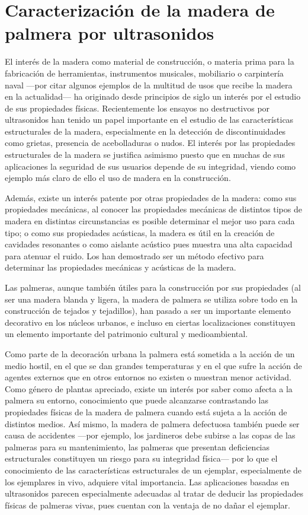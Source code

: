 \chapter{Caracterización de la madera de palmera por ultrasonidos}

El interés de la madera como material de construcción, o materia prima para
la fabricación de herramientas, instrumentos musicales, mobiliario o
carpintería naval ---por citar algunos ejemplos de la multitud de usos que
recibe la madera en la actualidad--- ha originado desde principios de siglo
un interés por el estudio de sus propiedades físicas. Recientemente los
ensayos no destructivos por ultrasonidos han tenido un papel importante en
el estudio de las características estructurales de la madera, especialmente
en la detección de discontinuidades como grietas, presencia de
acebolladuras o nudos. El interés por las propiedades estructurales de la
madera se justifica asimismo puesto que en muchas de sus aplicaciones la
seguridad de sus usuarios depende de su integridad, viendo como ejemplo más
claro de ello el uso de madera en la construcción.

Además, existe un interés patente por otras propiedades de la madera: como
sus propiedades mecánicas, al conocer las propiedades mecánicas de
distintos tipos de madera en distintas circunstancias es posible determinar
el mejor uso para cada tipo; o como sus propiedades acústicas, la madera es
útil en la creación de cavidades resonantes o como aislante acústico pues
muestra una alta capacidad para atenuar el ruido. Los  han
demostrado ser un método efectivo para determinar las propiedades mecánicas
y acústicas de la madera.

Las palmeras, aunque también útiles para la construcción por sus
propiedades (al ser una madera blanda y ligera, la madera de palmera se
utiliza sobre todo en la construcción de tejados y tejadillos), han pasado
a ser un importante elemento decorativo en los núcleos urbanos, e incluso
en ciertas localizaciones constituyen un elemento importante del patrimonio
cultural y medioambiental.

Como parte de la decoración urbana la palmera está sometida a la acción de
un medio hostil, en el que se dan grandes temperaturas y en el que sufre la
acción de agentes externos que en otros entornos no existen o muestran
menor actividad. Como género de plantas apreciado, existe un interés por
saber como afecta a la palmera su entorno, conocimiento que puede
alcanzarse contrastando las propiedades físicas de la madera de palmera
cuando está sujeta a la acción de distintos medios. Así mismo, la madera de
palmera defectuosa también puede ser causa de accidentes ---por ejemplo,
los jardineros debe subirse a las copas de las palmeras para su
mantenimiento, las palmeras que presentan deficiencias estructurales
constituyen un riesgo para su integridad física--- por lo que el
conocimiento de las características estructurales de un ejemplar,
especialmente de los ejemplares in vivo, adquiere vital importancia. Las
aplicaciones basadas en ultrasonidos parecen especialmente adecuadas al
tratar de deducir las propiedades físicas de palmeras vivas, pues cuentan
con la ventaja de no dañar el ejemplar.


